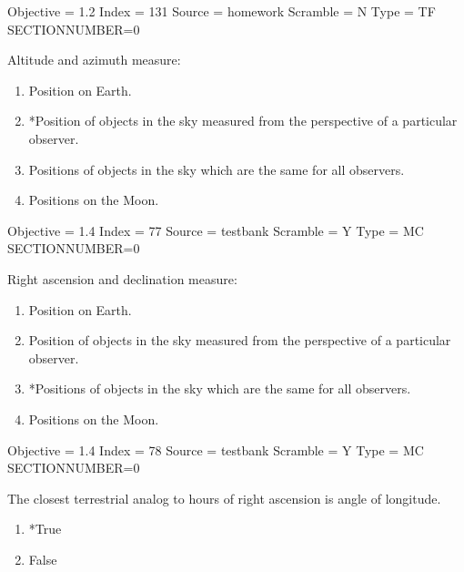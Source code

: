 \documentclass[11pt]{article}
\begin{document}
\begin{enumerate}
\begin{minipage}{\textwidth}
\begin{minipage}{\textwidth}
Objective = 1.2
Index = 131
Source = homework
Scramble = N
Type = TF
SECTIONNUMBER=0
\end{minipage}
\end{minipage}
\vskip 0.20in

\begin{minipage}{\textwidth}
\begin{minipage}{\textwidth}
\item Altitude and azimuth measure:
\begin{enumerate} 
\setlength{\itemsep}{1pt} 
\setlength{\parskip}{0pt} 
\setlength{\parsep}{0pt}
\setlength{\multicolsep}{1pt} 
\item Position on Earth.
\item *Position of objects in the sky measured from the perspective of a particular observer.
\item Positions of objects in the sky which are the same for all observers.
\item Positions on the Moon.
\end{enumerate} 
Objective = 1.4
Index = 77
Source = testbank
Scramble = Y
Type = MC
SECTIONNUMBER=0
\end{minipage}
\end{minipage}
\vskip 0.20in

\begin{minipage}{\textwidth}
\begin{minipage}{\textwidth}
\item Right ascension and declination measure:
\begin{enumerate} 
\setlength{\itemsep}{1pt} 
\setlength{\parskip}{0pt} 
\setlength{\parsep}{0pt}
\setlength{\multicolsep}{1pt} 
\item Position on Earth.
\item Position of objects in the sky measured from the perspective of a particular observer.
\item *Positions of objects in the sky which are the same for all observers.
\item Positions on the Moon.
\end{enumerate} 
Objective = 1.4
Index = 78
Source = testbank
Scramble = Y
Type = MC
SECTIONNUMBER=0
\end{minipage}
\end{minipage}
\vskip 0.20in

\begin{minipage}{\textwidth}
\begin{minipage}{\textwidth}
\item The closest terrestrial analog to hours of right ascension is angle of longitude.
\begin{multicols}{3}
\begin{enumerate} 
\setlength{\itemsep}{1pt} 
\setlength{\parskip}{0pt} 
\setlength{\parsep}{0pt}
\setlength{\multicolsep}{1pt} 
\item *True
\item False
\end{enumerate} 
\vfill 
\end{multicols}


\end{minipage}
\end{minipage}
\end{enumerate}
\end{document}
